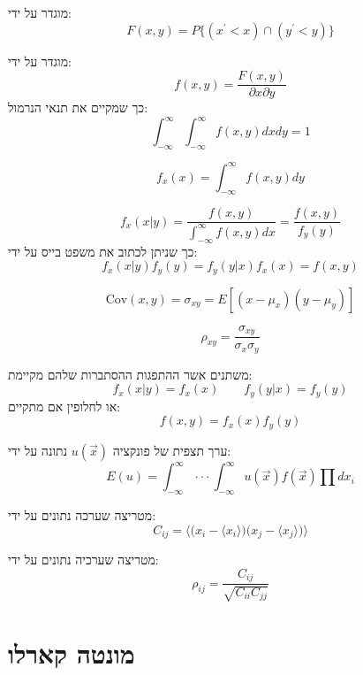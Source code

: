 \documentclass{tstextbook}
\begin{document}
\begin{definition}
מוגדר על ידי:
$$F(x,y)=P\{(x^{\prime}<x)\cap(y^{\prime}<y)\}$$

\end{definition}
\begin{definition}
מוגדר על ידי:
$$f(x,y)=\frac{F(x,y)}{\partial x\partial y}$$
כך שמקיים את תנאי הנרמול:
$$\int_{-\infty}^{\infty}\int_{-\infty}^{\infty}f(x,y)d x d y=1$$

\end{definition}
\begin{definition}
$$f_{x}(x)=\int_{-\infty}^{\infty}f(x,y)d y$$

\end{definition}
\begin{proposition}
$$f_{x}(x|y)={\frac{f(x,y)}{\int_{-\infty}^{\infty}f(x,y)d x}}={\frac{f(x,y)}{f_{y}(y)}}$$
כך שניתן לכתוב את משפט בייס על ידי:
$$f_{x}(x|y)f_{y}(y)=f_{y}(y|x)f_{x}(x)=f(x,y)$$

\end{proposition}
\begin{definition}
$$\mathrm{Cov}(x,y)=\sigma_{x y}=E[(x-\mu_{x})(y-\mu_{y})]$$

\end{definition}
\begin{definition}
$$\rho_{x y}={\frac{\sigma_{x y}}{\sigma_{x}\sigma_{y}}}$$

\end{definition}
\begin{definition}
משתנים אשר ההתפגות ההסתברות שלהם מקיימת:
$$f_{x}(x|y)=f_{x}(x)\qquad f_{y}(y|x)=f_{y}(y)$$
או לחלופין אם מתקיים:
$$f(x,y)=f_{x}(x)f_{y}(y)$$

\end{definition}
\begin{proposition}
ערך תצפית של פונקציה \(u\left( \vec{x} \right)\) נתונה על ידי:
$$E(u)=\int_{-\infty}^{\infty}\cdot\cdot\cdot\int_{-\infty}^{\infty}u(\vec{x})f(\vec{x})\prod d x_{i}$$

\end{proposition}
\begin{definition}
מטריצה שערכה נתונים על ידי:
$$C_{i j}=\langle{\big(}x_{i}-\langle x_{i}\rangle{\big)}{\big(}x_{j}-\langle x_{j}\rangle{\big)}\rangle$$

\end{definition}
\begin{definition}
מטריצה שערכיה נתונים על ידי:
$$\rho_{i j}={\frac{C_{i j}}{\sqrt{C_{i i}C_{j j}}}}$$

\end{definition}
\chapter{מונטה קארלו}
\end{document}

